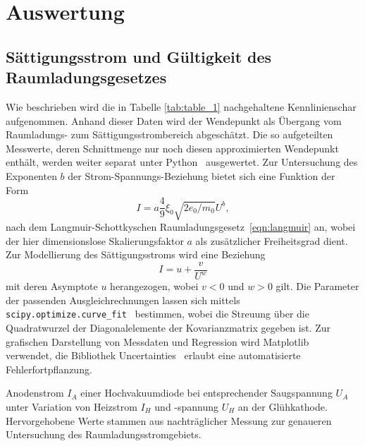 \section{Auswertung}
\label{sec:auswertung}

\subsection{Sättigungsstrom und Gültigkeit des Raumladungsgesetzes}

Wie beschrieben wird die in Tabelle \ref{tab:table_1} nachgehaltene Kennlinienschar aufgenommen. Anhand dieser Daten
wird der Wendepunkt als Übergang vom Raumladungs- zum Sättigungsstrombereich abgeschätzt. Die so aufgeteilten Messwerte, deren
Schnittmenge nur noch diesen approximierten Wendepunkt enthält, werden weiter separat unter Python~\cite{python} ausgewertet. Zur
Untersuchung des Exponenten $b$ der Strom-Spannungs-Beziehung bietet sich eine Funktion der Form
\begin{equation}
    I = a \frac{4}{9} \xi_0 \sqrt{2 e_0/m_0} U^b ,
	\label{eqn:fit_1}
\end{equation}
nach dem Langmuir-Schottkyschen Raumladungsgesetz~\eqref{eqn:langmuir} an, wobei der hier dimensionslose Skalierungsfaktor $a$
als zusätzlicher Freiheitsgrad dient. Zur Modellierung des Sättigungsstroms wird eine Beziehung
\begin{equation}
	I = u + \frac{v}{U^w}
	\label{eqn:fit_2}
\end{equation}
mit deren Asymptote $u$ herangezogen, wobei $v < 0$ und $w > 0$ gilt. Die Parameter der passenden Ausgleichrechnungen lassen sich mittels
\verb+scipy.optimize.curve_fit+~\cite{scipy} bestimmen, wobei die Streuung über die Quadratwurzel der Diagonalelemente der
Kovarianzmatrix gegeben ist. Zur grafischen Darstellung von Messdaten und Regression wird Matplotlib~\cite{matplotlib} verwendet,
die Bibliothek Uncertainties~\cite{uncertainties} erlaubt eine automatisierte Fehlerfortpflanzung.

\begin{table}[H]
	\caption{Anodenstrom $I_A$ einer Hochvakuumdiode bei entsprechender Saugspannung $U_A$ unter Variation von
			 Heizstrom $I_H$ und -spannung $U_H$ an der Glühkathode. Hervorgehobene Werte stammen aus nachträglicher
			 Messung zur genaueren Untersuchung des Raumladungsstromgebiets.}
	\centering
	
	\label{tab:table_1}
\end{table}

